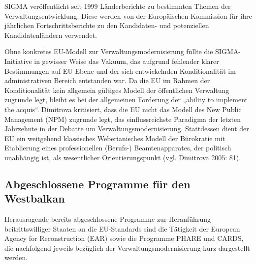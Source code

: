 SIGMA veröffentlicht seit 1999 Länderberichte zu bestimmten Themen der Verwaltungsentwicklung. Diese werden von der Europäischen Kommission für ihre jährlichen Fortschrittsberichte zu den Kandidaten- und potenziellen Kandidatenländern verwendet.\par
Ohne konkretes EU-Modell zur Verwaltungsmodernisierung füllte die SIGMA-Initiative in gewisser Weise das Vakuum, das aufgrund fehlender klarer Bestimmungen auf EU-Ebene und der sich entwickelnden Konditionalität im administrativen Bereich entstanden war. Da die EU im Rahmen der Konditionalität kein allgemein gültiges Modell der öffentlichen Verwaltung zugrunde legt, bleibt es bei der allgemeinen Forderung der „ability to implement the acquis“. Dimitrova kritisiert, dass die EU nicht das Modell des New Public Management (NPM) zugrunde legt, das einflussreichste Paradigma der letzten Jahrzehnte in der Debatte um Verwaltungsmodernisierung. Stattdessen dient der EU ein weitgehend klassisches Weberianisches Modell der Bürokratie mit Etablierung eines professionellen (Berufs-) Beamtenapparates, der politisch unabhängig ist, als wesentlicher Orientierungspunkt (vgl. Dimitrova 2005: 81).

\subsection{Abgeschlossene Programme für den Westbalkan}
Herausragende bereits abgeschlossene Programme zur Heranführung beitrittswilliger Staaten an die EU-Standards sind die Tätigkeit der European Agency for Reconstruction (EAR) sowie die Programme PHARE und CARDS, die nachfolgend jeweils bezüglich der Verwaltungsmodernisierung kurz dargestellt werden.

